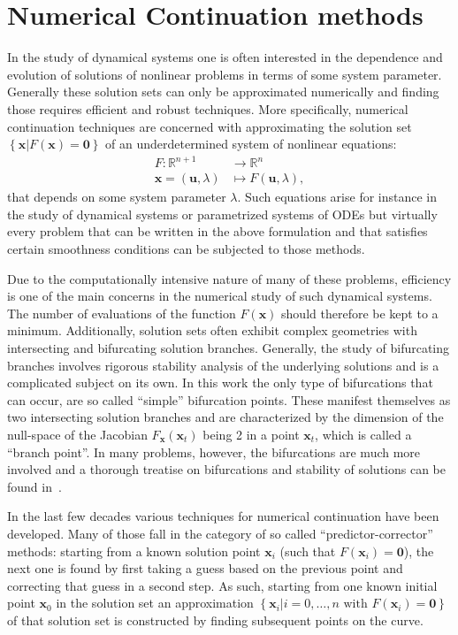 \documentclass[mathpazo]{cicp}
\begin{document}
\section{Numerical Continuation methods}
\label{sec:NumCont}
In the study of dynamical systems one is often interested in the dependence and evolution of solutions of nonlinear 
problems in terms of some system parameter. Generally these  solution sets can only be approximated numerically and finding 
those requires efficient and robust techniques. More specifically, numerical continuation techniques are concerned 
with approximating the solution set $\left\{ \mathbold{x} | F(\mathbold{x}) = \mathbold{0} \right\}$ of an underdetermined system of nonlinear equations:
\begin{align}
	F : \mathbb{R}^{n+1} &\longrightarrow \mathbb{R}^{n} \\
	\mathbold{x} = (\mathbold{u},\lambda) &\longmapsto F(\mathbold{u},\lambda),
\end{align}
that depends on some system parameter $\lambda$. Such equations arise for instance in the study of dynamical systems 
or parametrized systems of ODEs but virtually every problem that can be written in the above formulation and that satisfies 
certain smoothness conditions can be subjected to those methods.

Due to the computationally intensive nature of many of these problems, efficiency is one of the main concerns in the numerical study of 
such dynamical systems. The number of evaluations of the function $F(\mathbold{x})$ should therefore be kept to a minimum. Additionally, 
solution sets often exhibit complex geometries with intersecting and bifurcating solution branches. Generally, the study of bifurcating 
branches involves rigorous stability analysis of the underlying solutions and is a complicated subject on its own. In this work the only 
type of bifurcations that can occur, are so called ``simple'' bifurcation points. These manifest themselves as two intersecting solution 
branches and are characterized by the dimension of the null-space of the Jacobian $F_{\mathbold{x}}(\mathbold{x}_{t})$ being 2 in 
a point $\mathbold{x}_t$, which is called a ``branch point''. In many problems, however, the bifurcations are much more involved and 
a thorough treatise on bifurcations and stability of solutions can be found in~\cite{Seydel1994,Doedel2007,Allgower1990,Keller1977}.

In the last few decades various techniques for numerical continuation have been developed. Many of those fall in the category of so 
called ``predictor-corrector'' methods: starting  from a known solution point $\mathbold{x}_{i}$ (such 
that $F(\mathbold{x}_{i})=\mathbold{0}$), the next one is found by first taking a guess based on the previous point and correcting 
that guess in a second step. As such, starting from one known initial point $\mathbold{x}_{0}$ in the solution set an approximation 
$\left\{ \mathbold{x}_{i} | i=0,\ldots,n \text{ with } F(\mathbold{x}_{i})=\mathbold{0} \right\}$ of that solution set is constructed by finding 
subsequent points on the curve.
\end{document}
